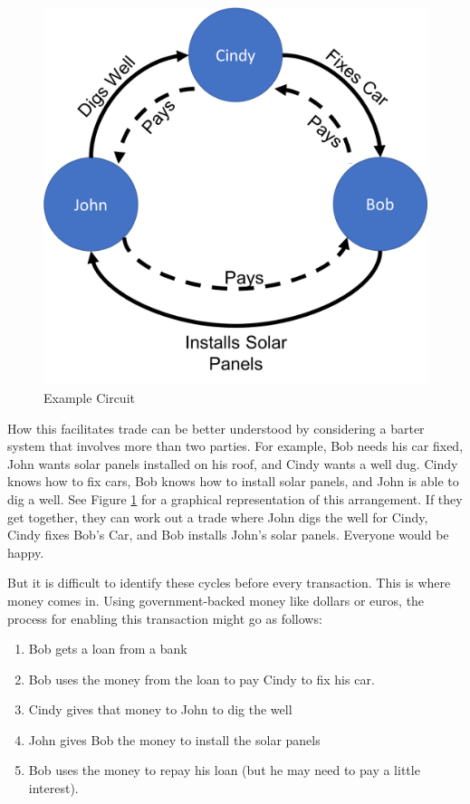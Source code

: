 \documentclass[runningheads]{llncs}
\newcommand{\figref}[1]{Figure \ref{#1}}
\begin{document}
\begin{figure}[h]
    \centering
    \includegraphics[scale=0.3]{ExampleCircuit.png}
    \caption{Example Circuit}
    \label{fig:liftProt}
\end{figure}
How this facilitates trade can be better understood by considering a barter system that involves more than two parties. 
For example, Bob needs his car fixed, John wants solar panels installed on his roof, and Cindy wants a well dug. Cindy knows how to fix cars, Bob knows how to install solar panels, and John is able to dig a well. See \figref{fig:liftProt} for a graphical representation of this arrangement. If they get together, they can work out a trade where John digs the well for Cindy, Cindy fixes Bob's Car, and Bob installs John's solar panels. Everyone would be happy.

But it is difficult to identify these cycles before every transaction. This is where money comes in. Using government-backed money like dollars or euros, the process for enabling this transaction might go as follows:
\begin{enumerate}
\item Bob gets a loan from a bank
\item Bob uses the money from the loan to pay Cindy to fix his car.
\item Cindy gives that money to John to dig the well
\item John gives Bob the money to install the solar panels
\item Bob uses the money to repay his loan (but he may need to pay a little 
interest).
\end{enumerate}
\end{document}
